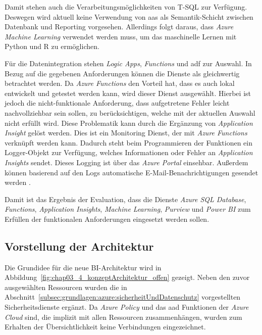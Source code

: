 Damit stehen auch die Verarbeitungsmöglichkeiten von T-SQL zur Verfügung. Deswegen wird aktuell keine Verwendung von \ac{aas} als Semantik-Schicht zwischen Datenbank und Reporting vorgesehen. Allerdings folgt daraus, dass \textit{Azure Machine Learning} verwendet werden muss, um das maschinelle Lernen mit Python und R zu ermöglichen.

Für die Datenintegration stehen \textit{Logic Apps}, \textit{Functions} und \ac{adf} zur Auswahl. In Bezug auf die gegebenen Anforderungen können die Dienste als gleichwertig betrachtet werden. Da \textit{Azure Functions} den Vorteil hat, dass es auch lokal entwickelt und getestet werden kann, wird dieser Dienst ausgewählt. Hierbei ist jedoch die nicht-funktionale Anforderung, dass aufgetretene Fehler leicht nachvollziehbar sein sollen, zu berücksichtigen, welche mit der aktuellen Auswahl nicht erfüllt wird. Diese Problematik kann durch die Ergänzung von \textit{Application Insight} gelöst werden. Dies ist ein Monitoring Dienst, der mit \textit{Azure Functions} verknüpft werden kann. Dadurch steht beim Programmieren der Funktionen ein Logger-Objekt zur Verfügung, welches Informationen oder Fehler an \textit{Application Insights} sendet. Dieses Logging ist über das \textit{Azure Portal} einsehbar. Außerdem können basierend auf den Logs automatische E-Mail-Benachrichtigungen gesendet werden \cite[vgl.][]{satapathi_hands-azure_2021}.

Damit ist das Ergebnis der Evaluation, dass die Dienste \textit{Azure SQL Database}, \textit{Functions}, \textit{Application Insights}, \textit{Machine Learning}, \textit{Purview} und \textit{Power BI} zum Erfüllen der funktionalen Anforderungen eingesetzt werden sollen. 

\subsection{Vorstellung der Architektur}
Die Grundidee für die neue BI-Architektur wird in Abbildung~\ref{fig:chap03_4_konzeptArchitektur_offen} gezeigt. Neben den zuvor ausgewählten Ressourcen wurden die in Abschnitt~\ref{subsec:grundlagen:azure:sicherheitUndDatenschutz} vorgestellten Sicherheitsdienste ergänzt. Da \textit{Azure Policy} und das \ac{aad} Funktionen der \textit{Azure Cloud} sind, die implizit mit allen Ressourcen zusammenhängen, wurden zum Erhalten der Übersichtlichkeit keine Verbindungen eingezeichnet. 

